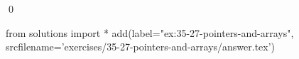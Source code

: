 
\begin{ex}
  \label{ex:35-27-pointers-and-arrays}
  
  \qed
\end{ex}
\begin{python0}
from solutions import *
add(label="ex:35-27-pointers-and-arrays",
    srcfilename='exercises/35-27-pointers-and-arrays/answer.tex')
\end{python0}
